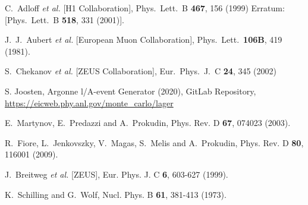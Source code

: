\documentclass[prd,amsmath,%
twocolumn,floatfix,amssymb, preprintnumbers, nofootinbib, superscriptaddress]{revtex4}
\begin{document}
\begin{thebibliography}{99}
  C.~Adloff {\it et al.} [H1 Collaboration],
  Phys.\ Lett.\ B {\bf 467}, 156 (1999)
  Erratum: [Phys.\ Lett.\ B {\bf 518}, 331 (2001)].
 

  J.~J.~Aubert {\it et al.} [European Muon Collaboration],
  Phys.\ Lett.\  {\bf 106B}, 419 (1981).
 


  S.~Chekanov {\it et al.} [ZEUS Collaboration],
  Eur.\ Phys.\ J.\ C \textbf{24}, 345 (2002)





S. Joosten, Argonne l/A-event Generator (2020), GitLab Repository,
\url{https://eicweb.phy.anl.gov/monte_carlo/lager}


E.~Martynov, E.~Predazzi and A.~Prokudin,
Phys. Rev. D \textbf{67}, 074023 (2003).

R.~Fiore, L.~Jenkovszky, V.~Magas, S.~Melis and A.~Prokudin,
Phys. Rev. D \textbf{80}, 116001 (2009). 

J.~Breitweg \textit{et al.} [ZEUS],
Eur. Phys. J. C \textbf{6}, 603-627 (1999). 


K.~Schilling and G.~Wolf,
Nucl. Phys. B \textbf{61}, 381-413 (1973).


\end{thebibliography}
\end{document}
